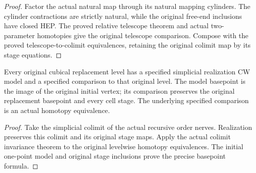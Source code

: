 \begin{proof}
  Factor the actual natural map through its natural mapping cylinders. The cylinder contractions are strictly natural, while the original free-end inclusions have closed HEP. The proved relative telescope theorem and actual two-parameter homotopies give the original telescope comparison. Compose with the proved telescope-to-colimit equivalences, retaining the original colimit map by its stage equations.
  \leanok
\end{proof}

\begin{proposition}
  \label{prop:actual-cubical-replacement-cw-comparison}
  \leanok
  Every original cubical replacement level has a specified simplicial realization CW model and a specified comparison to that original level. The model basepoint is the image of the original initial vertex; its comparison preserves the original replacement basepoint and every cell stage. The underlying specified comparison is an actual homotopy equivalence.
\end{proposition}
\begin{proof}
  Take the simplicial colimit of the actual recursive order nerves. Realization preserves this colimit and its original stage maps. Apply the actual colimit invariance theorem to the original levelwise homotopy equivalences. The initial one-point model and original stage inclusions prove the precise basepoint formula.
  \leanok
\end{proof}

